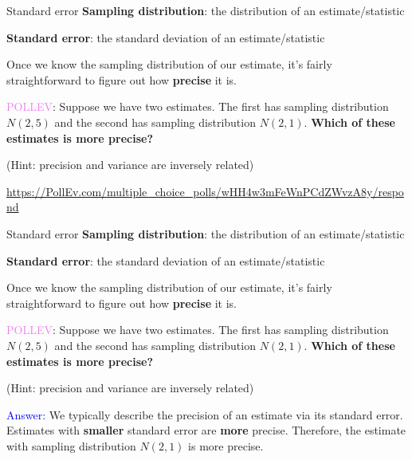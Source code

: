 \documentclass[10pt,t]{beamer}
\begin{document}
\begin{frame}{Standard error}
\textbf{Sampling distribution}: the distribution of an estimate/statistic
\medskip

\textbf{Standard error}: the standard deviation of an estimate/statistic

\vspace{0.3cm} 

Once we know the sampling distribution of our estimate, it's fairly straightforward to figure out how \textbf{precise} it is. 

\vspace{0.3cm}

\textcolor{violet}{POLLEV}: Suppose we have two estimates. The first has sampling distribution $N(2, 5)$ and the second has sampling distribution $N(2, 1)$. \textbf{Which of these estimates is more precise?}

\vspace{0.3cm}

(Hint: precision and variance are inversely related) 
\medskip

\footnotesize
\url{https://PollEv.com/multiple_choice_polls/wHH4w3mFeWnPCdZWvzA8y/respond}
\end{frame}

\begin{frame}{Standard error}
	\textbf{Sampling distribution}: the distribution of an estimate/statistic
	\medskip
	
	\textbf{Standard error}: the standard deviation of an estimate/statistic
	
	\vspace{0.3cm} 
	
	Once we know the sampling distribution of our estimate, it's fairly straightforward to figure out how \textbf{precise} it is. 
	
	\vspace{0.3cm}
	
	\textcolor{violet}{POLLEV}: Suppose we have two estimates. The first has sampling distribution $N(2, 5)$ and the second has sampling distribution $N(2, 1)$. \textbf{Which of these estimates is more precise?}
	
	\vspace{0.3cm}
	
	(Hint: precision and variance are inversely related) 
	
	\vspace{0.3cm}
	
	\normalsize \textcolor{blue}{Answer:} We typically describe the precision of an estimate via its standard error. Estimates with \textbf{smaller} standard error are \textbf{more} precise. Therefore, the estimate with sampling distribution $N(2, 1)$ is more precise.
\end{frame}
\end{document}
